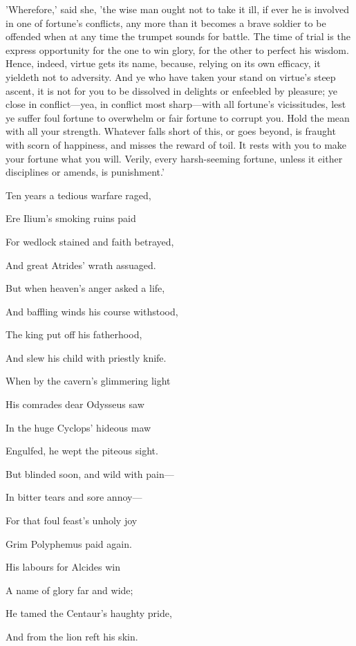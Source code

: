 'Wherefore,' said she, 'the wise man ought not to take it ill, if ever
he is involved in one of fortune's conflicts, any more than it becomes a
brave soldier to be offended when at any time the trumpet sounds for
battle. The time of trial is the express opportunity for the one to win
glory, for the other to perfect his wisdom. Hence, indeed, virtue gets
its name, because, relying on its own efficacy, it yieldeth not to
adversity. And ye who have taken your stand on virtue's steep ascent,
it is not for you to be dissolved in delights or enfeebled by pleasure;
ye close in conflict—yea, in conflict most sharp—with all fortune's
vicissitudes, lest ye suffer foul fortune to overwhelm or fair fortune
to corrupt you. Hold the mean with all your strength. Whatever falls
short of this, or goes beyond, is fraught with scorn of happiness, and
misses the reward of toil. It rests with you to make your fortune what
you will. Verily, every harsh-seeming fortune, unless it either
disciplines or amends, is punishment.'


Ten years a tedious warfare raged,

Ere Ilium's smoking ruins paid

For wedlock stained and faith betrayed,

And great Atrides' wrath assuaged.

But when heaven's anger asked a life,

And baffling winds his course withstood,

The king put off his fatherhood,

And slew his child with priestly knife.

When by the cavern's glimmering light

His comrades dear Odysseus saw

In the huge Cyclops' hideous maw

Engulfed, he wept the piteous sight.

But blinded soon, and wild with pain—

In bitter tears and sore annoy—

For that foul feast's unholy joy

Grim Polyphemus paid again.

His labours for Alcides win

A name of glory far and wide;

He tamed the Centaur's haughty pride,

And from the lion reft his skin.

